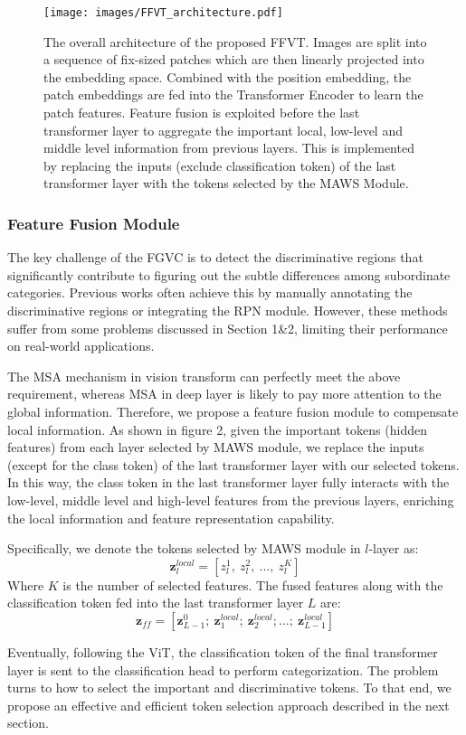 \documentclass{bmvc2k}
\begin{document}
\begin{figure*}[ht]   
    \centering 
    \texttt{[image: images/FFVT\_architecture.pdf]} 
    \caption{The overall architecture of the proposed FFVT. Images are split into a sequence of fix-sized patches which are then linearly projected into the embedding space. Combined with the position embedding, the patch embeddings are fed into the Transformer Encoder to learn the patch features. Feature fusion is exploited before the last transformer layer to aggregate the important local, low-level and middle level information from previous layers. This is implemented by replacing the inputs (exclude classification token) of the last transformer layer with the tokens selected by the MAWS Module. }    
    \label{fig_overall_architecture}  
\end{figure*}

\subsubsection{Feature Fusion Module}
The key challenge of the FGVC is to detect the discriminative regions that significantly contribute to figuring out the subtle differences among subordinate categories. Previous works often achieve this by manually annotating the discriminative regions or integrating the RPN module. However, these methods suffer from some problems discussed in Section 1\&2, limiting their performance on real-world applications.
\par
The MSA mechanism in vision transform can perfectly meet the above requirement, whereas MSA in deep layer is likely to pay more attention to the global information. Therefore, we propose a feature fusion module to compensate local information. As shown in figure 2, given the important tokens (hidden features) from each layer selected by MAWS module, we replace the inputs (except for the class token) of the last transformer layer with our selected tokens. In this way, the class token in the last transformer layer fully interacts with the low-level, middle level and high-level features from the previous layers, enriching the local information and feature representation capability. 
\par
Specifically, we denote the tokens selected by MAWS module in $l$-layer as:
\begin{equation}
 \bm{z}_l^{local}=[z_l^1,\ z_l^2,\ ...,\ z_l^K]
\end{equation}
Where $K$ is the number of selected features. The fused features along with the classification token fed into the last transformer layer $L$ are:
\begin{equation}
 \bm{z}_{ff}=[\bm{z}_{L-1}^0;\  \bm{z}_1^{local};\  \bm{z}_2^{local};  ...;\  \bm{z}_{L-1}^{local}]
\end{equation}
\par
Eventually, following the ViT, the classification token of the final transformer layer is sent to the classification head to perform categorization. The problem turns to how to select the important and discriminative tokens. To that end, we propose an effective and efficient token selection approach described in the next section.
\end{document}
